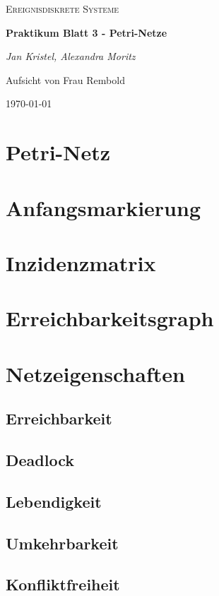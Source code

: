 \documentclass{article}
\begin{document}
		\begin{titlepage}
		\centering
		{\scshape\LARGE
			Ereignisdiskrete Systeme
			\par}
		\vspace{1.5cm}
		{\huge\bfseries Praktikum Blatt 3 - Petri-Netze\par}
		\vspace{1.5cm}
		{\LARGE\itshape Jan Kristel, Alexandra Moritz\par}
		\vfill
			Aufsicht von Frau Rembold\par
			
		\vfill	
			{\large \today \par}	
		
	\end{titlepage}
	
	\tableofcontents
	\newpage
	
	\section{Petri-Netz}
	\section{Anfangsmarkierung}
	\section{Inzidenzmatrix}
	\section{Erreichbarkeitsgraph}
	\section{Netzeigenschaften}
		\subsection*{Erreichbarkeit}
		\subsection*{Deadlock}
		\subsection*{Lebendigkeit}
		\subsection*{Umkehrbarkeit}
		\subsection*{Konfliktfreiheit}
\end{document}
